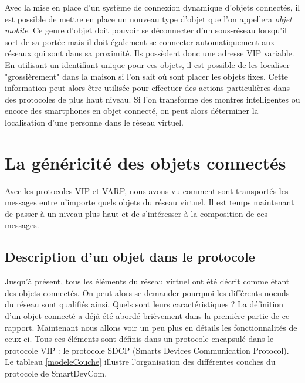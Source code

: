 		Avec la mise en place d'un système de connexion dynamique d'objets connectés, il est possible
		de mettre en place un nouveau type d'objet que l'on appellera \emph{objet mobile}. Ce genre
		d'objet doit pouvoir se déconnecter d'un sous-réseau lorsqu'il sort de sa portée mais il doit 
		également se connecter automatiquement aux réseaux qui sont dans sa proximité. Ils possèdent
		donc une adresse VIP variable. En utilisant un identifiant unique pour ces objets, il est
		possible de les localiser "grossièrement" dans la maison si l'on sait où sont placer les
		objets fixes. Cette information peut alors être utilisée pour effectuer des actions
		particulières dans des protocoles de plus haut niveau. Si l'on transforme des montres 
		intelligentes ou encore des smartphones en objet connecté, on peut alors déterminer la
		localisation d'une personne dans le réseau virtuel.
	
 
\section{La généricité des objets connectés}
	Avec les protocoles VIP et VARP, nous avons vu comment sont transportés les messages entre 
	n'importe quels objets du réseau virtuel. Il est temps maintenant de passer à un niveau plus haut
	et de s'intéresser à la composition de ces messages. 
	
	\subsection{Description d'un objet dans le protocole}
		Jusqu'à présent, tous les éléments du réseau virtuel ont été décrit comme étant des objets
		connectés. On peut alors se demander pourquoi les différents noeuds du réseau sont qualifiés
		ainsi. Quels sont leurs caractéristiques ? La définition d'un objet connecté a déjà été 
		abordé brièvement dans la première partie de ce rapport. Maintenant nous allons voir un peu
		plus en détails les fonctionnalités de ceux-ci. Tous ces éléments sont définis dans 
		un protocole encapsulé dans le protocole VIP : le protocole SDCP (Smarts Devices 
		Communication Protocol). Le tableau \ref{modeleCouche} illustre l'organisation des différentes
		couches du protocole de SmartDevCom.
		

